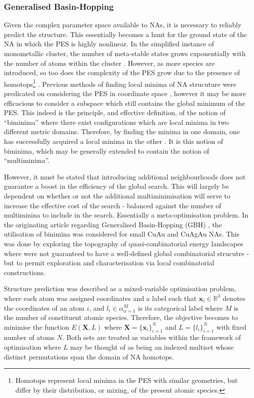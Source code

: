 \subsubsection{Generalised Basin-Hopping}
\label{sec:GBH}
Given the complex parameter space available to NAs, it is necessary to reliably predict the structure. This essentially becomes a hunt for the ground state of the NA in which the PES is highly nonlinear. In the simplified instance of monometallic cluster, the number of meta-stable states grows exponentially with the number of atoms within the cluster \cite{PhysRevA.25.978,10.1063/1.1625644}. However, as more species are introduced, so too does the complexity of the PES grow due to the presence of homotops\footnote{Homotops represent local minima in the PES with similar geometries, but differ by their distribution, or mixing, of the present atomic species.} \cite{JELLINEK1996283}. Previous methods of finding local minima of NA strucuture were predicated on considering the PES in coordinate space \cite{doi:10.1021/jp970984n,B305686D,10.1063/1.1724816}, however it may be more efficacious to consider a subspace which still contains the global minimum of the PES. This indeed is the principle, and effective definition, of the notion of ``biminima'' where there exist configurations which are local minima in two different metric domains. Therefore, by finding the minima in one domain, one has successfully acquired a local minima in the other \cite{PhysRevLett.113.156102}. It is this notion of biminima, which may be generally extended to contain the notion of ``multiminima''. 

However, it must be stated that introducing additional neighbourhoods does not guarantee a boost in the efficiency of the global search. This will largely be dependent on whether or not the additional multiminimisation will serve to increase the effective cost of the search - balanced against the number of multiminina to include in the search. Essentially a meta-optimisation problem. In the originating article regarding Generalised Basin-Hopping (GBH) \cite{C5CP01198A}, the utilisation of binimina was considered for small CuAu and CuAgAu NAs. This was done by exploring the topography of quasi-combinatorial energy landscapes where were not guaranteed to have a well-defined global combinatorial strucutre - but to permit exploration and characterisation via local combinatorial constructions.

Structure prediction was described as a mixed-variable optimisation problem, where each atom was assigned coordinates and a label such that $\textbf{x}_{i} \in \mathbb{R}^{3}$ denotes the coordinates of an atom $i$, and $l_{i} \in \alpha_{\alpha=1}^{M}$ is its categorical label where $M$ is the number of constituent atomic species. Therefore, the objective becomes to minimise the function $E\left(\textbf{X},L\right)$ where $\textbf{X} = \lbrace \textbf{x}_{i}\rbrace_{i=1}^{N}$ and $L=\lbrace l_{i}\rbrace_{i=1}^{N}$ with fixed number of atoms $N$. Both sets are treated as variables within the framework of optimisation where $L$ may be thought of as being an indexed multiset whose distinct permutations span the domain of NA homotops. 

